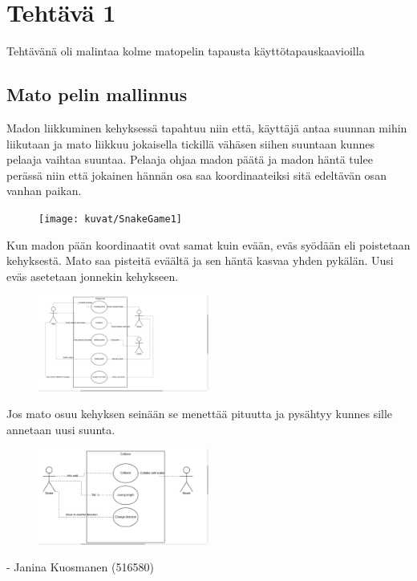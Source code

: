 
\chapter{Tehtävä 1 \label{chap:Teht=0000E4v=0000E4-1}}

Tehtävänä oli malintaa kolme matopelin tapausta käyttötapauskaavioilla
\section{Mato pelin mallinnus}

\label{Madon liikkuminen}

Madon liikkuminen kehyksessä tapahtuu niin että, käyttäjä antaa suunnan mihin liikutaan ja mato liikkuu jokaisella 
tickillä vähäsen siihen suuntaan kunnes pelaaja vaihtaa suuntaa. Pelaaja ohjaa madon päätä ja madon häntä tulee perässä
niin että jokainen hännän osa saa koordinaateiksi sitä edeltävän osan vanhan paikan.

\begin{figure}
\centering \texttt{[image: kuvat/SnakeGame1]}
\label{Liikkuminen} 
\end{figure}

\label{Evään syönti}
Kun madon pään koordinaatit ovat samat kuin evään, eväs syödään eli poistetaan kehyksestä. Mato saa pisteitä eväältä ja sen häntä kasvaa yhden pykälän. Uusi eväs asetetaan jonnekin kehykseen. 

\begin{figure}
\centering \includegraphics[width=0.5\textwidth]{kuvat/SnakeGame2}
\label{Syönti} 
\end{figure}

\label{Törmäys}
Jos mato osuu kehyksen seinään se menettää pituutta ja pysähtyy kunnes sille annetaan uusi suunta. 
\begin{figure}
\centering \includegraphics[width=0.5\textwidth]{kuvat/SnakeGame3}
\label{törmäysSeinään} 
\end{figure}




- Janina Kuosmanen (516580)
